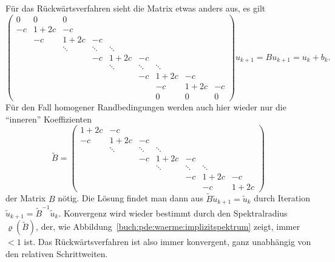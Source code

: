 Für das Rückwärtsverfahren sieht die Matrix etwas anders aus, es gilt
%
\begin{equation}
\begin{pmatrix}
   0  &    0  &   0  &      &      &      &      &      &      \\
  -c  &  1+2c &  -c  &      &      &      &      &      &      \\
      &   -c  & 1+2c &  -c  &      &      &      &      &      \\
      &       &\ddots&\ddots&\ddots&      &      &      &      \\
      &       &      &  -c  & 1+2c &  -c  &      &      &      \\
      &       &      &      &\ddots&\ddots&\ddots&      &      \\
      &       &      &      &      &  -c  & 1+2c &  -c  &      \\
      &       &      &      &      &      &  -c  & 1+2c &  -c  \\
      &       &      &      &      &      &   0  &   0  &   0  
\end{pmatrix}
u_{k+1}
=
Bu_{k+1}
=
u_k + b_k.
\end{equation}
Für den Fall homogener Randbedingungen werden auch hier wieder
nur die ``inneren'' Koeffizienten
\[
\tilde{B}
=
\begin{pmatrix}
 1+2c &  -c  &      &      &      &      &      \\
  -c  & 1+2c &  -c  &      &      &      &      \\
      &\ddots&\ddots&\ddots&      &      &      \\
      &      &  -c  & 1+2c &  -c  &      &      \\
      &      &      &\ddots&\ddots&\ddots&      \\
      &      &      &      &  -c  & 1+2c &  -c  \\
      &      &      &      &      &  -c  & 1+2c 
\end{pmatrix}
\]
der Matrix $B$ nötig.
Die Lösung findet man dann aus $\tilde{B}\tilde{u}_{k+1}=\tilde{u}_k$
durch Iteration $\tilde{u}_{k+1}=\tilde{B}^{-1} \tilde{u}_k$.
Konvergenz wird wieder bestimmt durch den Spektralradius $\varrho(\tilde{B})$,
der, wie Abbildung~\ref{buch:pde:waerme:implizitspektrum} zeigt, immer
$<1$ ist.
Das Rückwärtsverfahren ist also immer konvergent, ganz unabhängig von
den relativen Schrittweiten.
